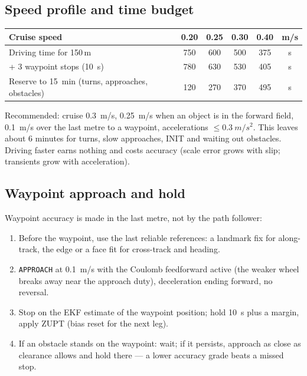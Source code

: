 \documentclass[11pt,a4paper]{article}
\newcommand{\code}[1]{\texttt{\small #1}}
\begin{document}
\subsection{Speed profile and time budget}\label{sec:timebudget}

\begin{center}
\small
\begin{tabular}{@{}lccccc@{}}
\toprule
\textbf{Cruise speed} & 0.20 & 0.25 & 0.30 & 0.40 & m/s\\
\midrule
Driving time for 150\,m & 750 & 600 & 500 & 375 & s\\
+ 3 waypoint stops (\qty{10}{s}) & 780 & 630 & 530 & 405 & s\\
Reserve to \qty{15}{min} (turns, approaches, obstacles) & 120 & 270 & 370 & 495 & s\\
\bottomrule
\end{tabular}
\end{center}

Recommended: cruise \qty{0.3}{m/s}, \qty{0.25}{m/s} when an object is in the
forward field, \qty{0.1}{m/s} over the last metre to a waypoint, accelerations
$\leq\qty{0.3}{m/s^2}$. This leaves about 6 minutes for turns, slow approaches,
INIT and waiting out obstacles. Driving faster earns nothing and costs accuracy
(scale error grows with slip; transients grow with acceleration).

\subsection{Waypoint approach and hold}

Waypoint accuracy is made in the last metre, not by the path follower:
\begin{enumerate}[leftmargin=6mm]
\item Before the waypoint, use the last reliable references: a landmark fix for
along-track, the edge or a face fit for cross-track and heading.
\item \code{APPROACH} at \qty{0.1}{m/s} with the Coulomb feedforward active (the
weaker wheel breaks away near the approach duty), deceleration ending forward,
no reversal.
\item Stop on the EKF estimate of the waypoint position; hold \qty{10}{s} plus a
margin, apply ZUPT (bias reset for the next leg).
\item If an obstacle stands on the waypoint: wait; if it persists, approach as
close as clearance allows and hold there --- a lower accuracy grade beats a
missed stop.
\end{enumerate}
\end{document}
